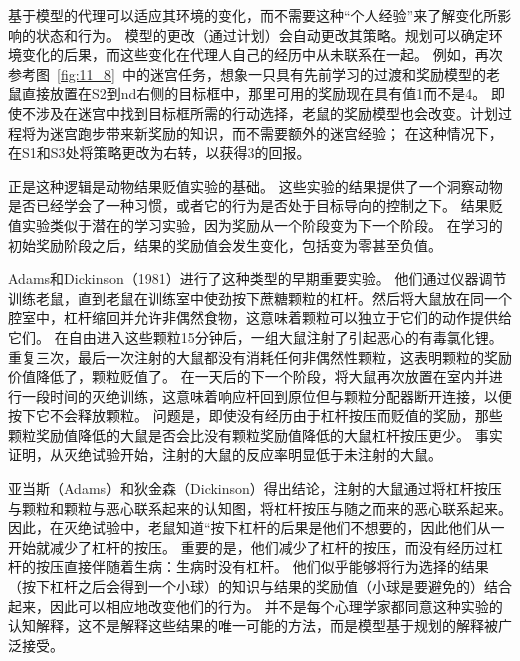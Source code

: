 {{{{{{{{{{{{{基于模型的代理可以适应其环境的变化，而不需要这种“个人经验”来了解变化所影响的状态和行为。
模型的更改（通过计划）会自动更改其策略。规划可以确定环境变化的后果，而这些变化在代理人自己的经历中从未联系在一起。
例如，再次参考图~\ref{fig:11_8}~中的迷宫任务，想象一只具有先前学习的过渡和奖励模型的老鼠直接放置在S2到nd右侧的目标框中，那里可用的奖励现在具有值1而不是4。
即使不涉及在迷宫中找到目标框所需的行动选择，老鼠的奖励模型也会改变。计划过程将为迷宫跑步带来新奖励的知识，而不需要额外的迷宫经验；
在这种情况下，在S1和S3处将策略更改为右转，以获得3的回报。


正是这种逻辑是动物结果贬值实验的基础。
这些实验的结果提供了一个洞察动物是否已经学会了一种习惯，或者它的行为是否处于目标导向的控制之下。
结果贬值实验类似于潜在的学习实验，因为奖励从一个阶段变为下一个阶段。
在学习的初始奖励阶段之后，结果的奖励值会发生变化，包括变为零甚至负值。


Adams和Dickinson（1981）进行了这种类型的早期重要实验。
他们通过仪器调节训练老鼠，直到老鼠在训练室中使劲按下蔗糖颗粒的杠杆。然后将大鼠放在同一个腔室中，杠杆缩回并允许非偶然食物，这意味着颗粒可以独立于它们的动作提供给它们。
在自由进入这些颗粒15分钟后，一组大鼠注射了引起恶心的有毒氯化锂。
重复三次，最后一次注射的大鼠都没有消耗任何非偶然性颗粒，这表明颗粒的奖励价值降低了，颗粒贬值了。
在一天后的下一个阶段，将大鼠再次放置在室内并进行一段时间的灭绝训练，这意味着响应杆回到原位但与颗粒分配器断开连接，以便按下它不会释放颗粒。
问题是，即使没有经历由于杠杆按压而贬值的奖励，那些颗粒奖励值降低的大鼠是否会比没有颗粒奖励值降低的大鼠杠杆按压更少。
事实证明，从灭绝试验开始，注射的大鼠的反应率明显低于未注射的大鼠。


亚当斯（Adams）和狄金森（Dickinson）得出结论，注射的大鼠通过将杠杆按压与颗粒和颗粒与恶心联系起来的认知图，将杠杆按压与随之而来的恶心联系起来。
因此，在灭绝试验中，老鼠知道“按下杠杆的后果是他们不想要的，因此他们从一开始就减少了杠杆的按压。
重要的是，他们减少了杠杆的按压，而没有经历过杠杆的按压直接伴随着生病：生病时没有杠杆。
他们似乎能够将行为选择的结果（按下杠杆之后会得到一个小球）的知识与结果的奖励值（小球是要避免的）结合起来，因此可以相应地改变他们的行为。
并不是每个心理学家都同意这种实验的认知解释，这不是解释这些结果的唯一可能的方法，而是模型基于规划的解释被广泛接受。


}}}}}}}}}}}}}
